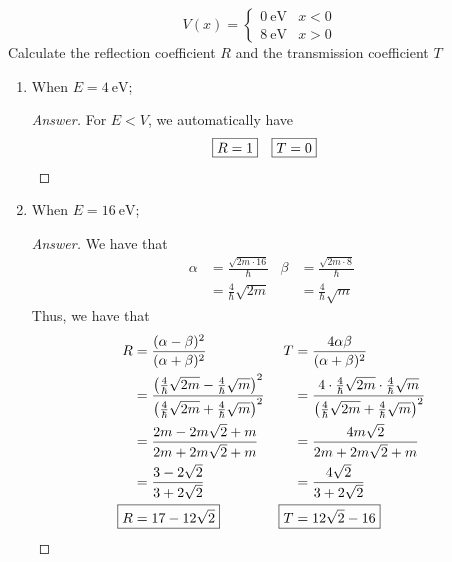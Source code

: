 \documentclass[../psets.tex]{subfiles}
\begin{document}
\begin{enumerate}
\begin{equation*}
        V(x) =
        \begin{cases}
            \SI{0}{\electronvolt} & x<0\\
            \SI{8}{\electronvolt} & x>0
        \end{cases}
    \end{equation*}
    Calculate the reflection coefficient $R$ and the transmission coefficient $T$
    \begin{enumerate}
        \item When $E=\SI{4}{\electronvolt}$;
        \begin{proof}[Answer]
            For $E<V$, we automatically have
            \begin{align*}
                \Aboxed{R &= 1}&
                \Aboxed{T &= 0}
            \end{align*}
        \end{proof}
        \item When $E=\SI{16}{\electronvolt}$;
        \begin{proof}[Answer]
            We have that
            \begin{align*}
                \alpha &= \frac{\sqrt{2m\cdot 16}}{\hbar}&
                    \beta &= \frac{\sqrt{2m\cdot 8}}{\hbar}\\
                &= \frac{4}{\hbar}\sqrt{2m}&
                    &= \frac{4}{\hbar}\sqrt{m}
            \end{align*}
            Thus, we have that
            \begin{align*}
                R &= \frac{(\alpha-\beta)^2}{(\alpha+\beta)^2}&
                    T &= \frac{4\alpha\beta}{(\alpha+\beta)^2}\\
                &= \frac{\left( \frac{4}{\hbar}\sqrt{2m}-\frac{4}{\hbar}\sqrt{m} \right)^2}{\left( \frac{4}{\hbar}\sqrt{2m}+\frac{4}{\hbar}\sqrt{m} \right)^2}&
                    &= \frac{4\cdot\frac{4}{\hbar}\sqrt{2m}\cdot\frac{4}{\hbar}\sqrt{m}}{\left( \frac{4}{\hbar}\sqrt{2m}+\frac{4}{\hbar}\sqrt{m} \right)^2}\\
                &= \frac{2m-2m\sqrt{2}+m}{2m+2m\sqrt{2}+m}&
                    &= \frac{4m\sqrt{2}}{2m+2m\sqrt{2}+m}\\
                &= \frac{3-2\sqrt{2}}{3+2\sqrt{2}}&
                    &= \frac{4\sqrt{2}}{3+2\sqrt{2}}\\
                \Aboxed{R &= 17-12\sqrt{2}}&
                    \Aboxed{T &= 12\sqrt{2}-16}
            \end{align*}
        \end{proof}

\end{enumerate}
\end{enumerate}
\end{document}
